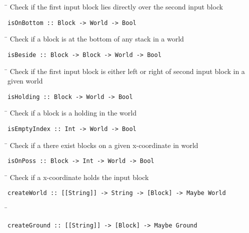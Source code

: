 \begin{tabbing}
\hspace*{1cm}\= \kill
\> Check if the first input block lies directly over the second input block
\end{tabbing}
\begin{verbatim}
isOnBottom :: Block -> World -> Bool
\end{verbatim}
\begin{tabbing}
\hspace*{1cm}\= \kill
\> Check if a block is at the bottom of any stack in a world
\end{tabbing}
\begin{verbatim}
isBeside :: Block -> Block -> World -> Bool
\end{verbatim}
\begin{tabbing}
\hspace*{1cm}\= \kill
\> Check if the first input block is either left or right of second input block in a \\
\> given world
\end{tabbing}
\begin{verbatim}
isHolding :: Block -> World -> Bool
\end{verbatim}
\begin{tabbing}
\hspace*{1cm}\= \kill
\> Check if a block is a holding in the world
\end{tabbing}
\begin{verbatim}
isEmptyIndex :: Int -> World -> Bool
\end{verbatim}
\begin{tabbing}
\hspace*{1cm}\= \kill
\> Check if a there exist blocks on a given x-coordinate in world
\end{tabbing}
\begin{verbatim}
isOnPoss :: Block -> Int -> World -> Bool
\end{verbatim}
\begin{tabbing}
\hspace*{1cm}\= \kill
\> Check if a x-coordinate holds the input block
\end{tabbing}
\begin{verbatim}
createWorld :: [[String]] -> String -> [Block] -> Maybe World
\end{verbatim}
\begin{tabbing}
\hspace*{1cm}\= \kill
\> 
\end{tabbing}
\begin{verbatim}
createGround :: [[String]] -> [Block] -> Maybe Ground
\end{verbatim}
